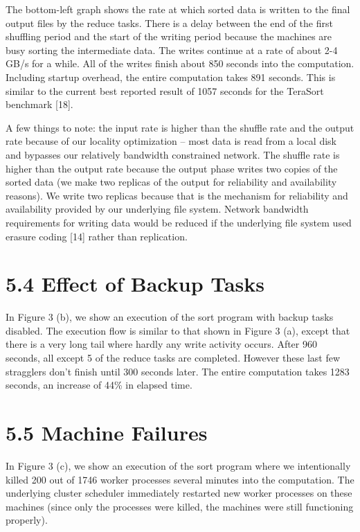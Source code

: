 \documentclass[
]{article}
\begin{document}
The bottom-left graph shows the rate at which sorted data is written to
the final output files by the reduce tasks. There is a delay between the
end of the first shuffling period and the start of the writing period
because the machines are busy sorting the intermediate data. The writes
continue at a rate of about 2-4 GB/s for a while. All of the writes
finish about 850 seconds into the computation. Including startup
overhead, the entire computation takes 891 seconds. This is similar to
the current best reported result of 1057 seconds for the TeraSort
benchmark {[}18{]}.

A few things to note: the input rate is higher than the shuffle rate and
the output rate because of our locality optimization -- most data is
read from a local disk and bypasses our relatively bandwidth constrained
network. The shuffle rate is higher than the output rate because the
output phase writes two copies of the sorted data (we make two replicas
of the output for reliability and availability reasons). We write two
replicas because that is the mechanism for reliability and availability
provided by our underlying file system. Network bandwidth requirements
for writing data would be reduced if the underlying file system used
erasure coding {[}14{]} rather than replication.

\section{5.4 Effect of Backup Tasks}\label{effect-of-backup-tasks}

In Figure 3 (b), we show an execution of the sort program with backup
tasks disabled. The execution flow is similar to that shown in Figure 3
(a), except that there is a very long tail where hardly any write
activity occurs. After 960 seconds, all except 5 of the reduce tasks are
completed. However these last few stragglers don't finish until 300
seconds later. The entire computation takes 1283 seconds, an increase of
44\% in elapsed time.

\section{5.5 Machine Failures}\label{machine-failures}

In Figure 3 (c), we show an execution of the sort program where we
intentionally killed 200 out of 1746 worker processes several minutes
into the computation. The underlying cluster scheduler immediately
restarted new worker processes on these machines (since only the
processes were killed, the machines were still functioning properly).
\end{document}
